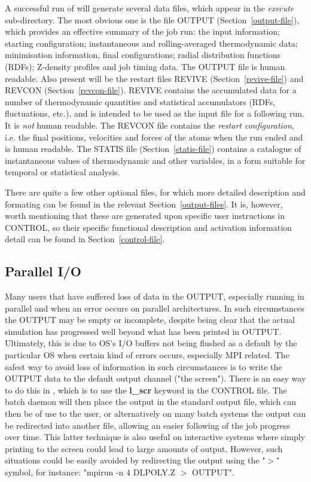 A successful run of \D will generate several data files, which
appear in the {\em execute} sub-directory.  The most obvious one
is the file OUTPUT (Section~\ref{output-file}), which provides an
effective summary of the job run: the input information; starting
configuration; instantaneous and rolling-averaged thermodynamic
data; minimisation information, final configurations;
radial distribution functions (RDFs); Z-density profiles
and job timing data.  The OUTPUT file is human readable.  Also
present will be the restart files REVIVE (Section~\ref{revive-file})
and REVCON (Section~\ref{revcon-file}).  REVIVE contains the
accumulated data for a number of thermodynamic quantities and
statistical accumulators (RDFs, fluctuations, etc.), and is
intended to be used as the input file for a following run.
It is {\em not} human readable.  The REVCON file contains the
{\em restart configuration}, i.e. the final positions, velocities
and forces of the atoms when the run ended and is human readable.
The STATIS file (Section~\ref{statis-file}) contains a catalogue
of instantaneous values of thermodynamic and other variables, in
a form suitable for temporal or statistical analysis.

There are quite a few other optional files, for which more detailed
description and formating can be found in the relevant
Section~\ref{output-files}.  It is, however, worth mentioning that
these are generated upon specific user instructions in CONTROL,
so their specific functional description and activation information
detail can be found in Section~\ref{control-file}.

\subsection{Parallel I/O}

Many users that have suffered loss of data in the OUTPUT, especially
running in parallel and when an error occurs on parallel architectures.
In such circumstances the OUTPUT may be empty or incomplete, despite
being clear that the actual simulation has progressed well beyond what
has been printed in OUTPUT.  Ultimately, this is due to OS's I/O
buffers not being flushed as a default by the particular OS when
certain kind of errors occurs, especially MPI related.  The safest way
to avoid loss of information in such circumstances is to write the
OUTPUT data to the default output channel ("the screen").  There is an
easy way to do this in \D, which is to use the {\bf l\_scr} keyword in
the CONTROL file.  The batch daemon will then place the output in the
standard output file, which can then be of use to the user, or
alternatively on many batch systems the output can be redirected into
another file, allowing an easier following of the job progress over
time.  This latter technique is also useful on interactive systems
where simply printing to the screen could lead to large amounts of
output.  However, such situations could be easily avoided by
redirecting the output using the "$>$" symbol, for instance:
"mpirun -n 4 DLPOLY.Z $>$ OUTPUT".

